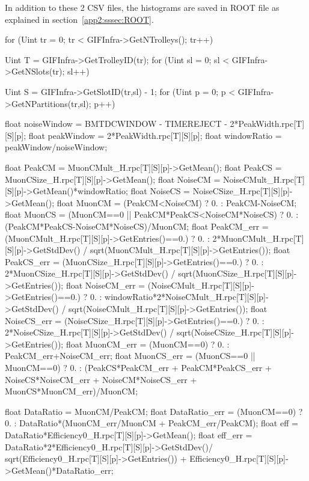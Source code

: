	In addition to these 2 CSV files, the histograms are saved in ROOT file  as explained in section~\ref{app2:sssec:ROOT}.\\
	
	\begin{code}
	\begin{cppcode}
for (Uint tr = 0; tr < GIFInfra->GetNTrolleys(); tr++){
	Uint T = GIFInfra->GetTrolleyID(tr);
	for (Uint sl = 0; sl < GIFInfra->GetNSlots(tr); sl++){
		Uint S = GIFInfra->GetSlotID(tr,sl) - 1;
		for (Uint p = 0; p < GIFInfra->GetNPartitions(tr,sl); p++){
			float noiseWindow =
				BMTDCWINDOW - TIMEREJECT - 2*PeakWidth.rpc[T][S][p];
			float peakWindow = 2*PeakWidth.rpc[T][S][p];
			float windowRatio = peakWindow/noiseWindow;

			float PeakCM = MuonCMult_H.rpc[T][S][p]->GetMean();
			float PeakCS = MuonCSize_H.rpc[T][S][p]->GetMean();
			float NoiseCM = NoiseCMult_H.rpc[T][S][p]->GetMean()*windowRatio;
			float NoiseCS = NoiseCSize_H.rpc[T][S][p]->GetMean();
			float MuonCM = (PeakCM<NoiseCM) ? 0. : PeakCM-NoiseCM;
			float MuonCS = (MuonCM==0 || PeakCM*PeakCS<NoiseCM*NoiseCS)
				? 0.
				: (PeakCM*PeakCS-NoiseCM*NoiseCS)/MuonCM;
			float PeakCM_err = (MuonCMult_H.rpc[T][S][p]->GetEntries()==0.)
				? 0.
				: 2*MuonCMult_H.rpc[T][S][p]->GetStdDev() /
							sqrt(MuonCMult_H.rpc[T][S][p]->GetEntries());
			float PeakCS_err = (MuonCSize_H.rpc[T][S][p]->GetEntries()==0.)
				? 0.
				: 2*MuonCSize_H.rpc[T][S][p]->GetStdDev() /
							sqrt(MuonCSize_H.rpc[T][S][p]->GetEntries());
			float NoiseCM_err = (NoiseCMult_H.rpc[T][S][p]->GetEntries()==0.)
				? 0.
				: windowRatio*2*NoiseCMult_H.rpc[T][S][p]->GetStdDev() /
							sqrt(NoiseCMult_H.rpc[T][S][p]->GetEntries());
			float NoiseCS_err = (NoiseCSize_H.rpc[T][S][p]->GetEntries()==0.)
				? 0.
				: 2*NoiseCSize_H.rpc[T][S][p]->GetStdDev() /
							sqrt(NoiseCSize_H.rpc[T][S][p]->GetEntries());
			float MuonCM_err = (MuonCM==0) ? 0. : PeakCM_err+NoiseCM_err;
			float MuonCS_err = (MuonCS==0 || MuonCM==0) ? 0.
				: (PeakCS*PeakCM_err + PeakCM*PeakCS_err +
					NoiseCS*NoiseCM_err + NoiseCM*NoiseCS_err +
					MuonCS*MuonCM_err)/MuonCM;

			float DataRatio = MuonCM/PeakCM;
			float DataRatio_err = (MuonCM==0) ? 0.
				: DataRatio*(MuonCM_err/MuonCM + PeakCM_err/PeakCM);
			float eff = DataRatio*Efficiency0_H.rpc[T][S][p]->GetMean();
			float eff_err =  DataRatio*2*Efficiency0_H.rpc[T][S][p]->GetStdDev()/
						sqrt(Efficiency0_H.rpc[T][S][p]->GetEntries()) +
						Efficiency0_H.rpc[T][S][p]->GetMean()*DataRatio_err;

}}}
\end{cppcode}
\end{code}
